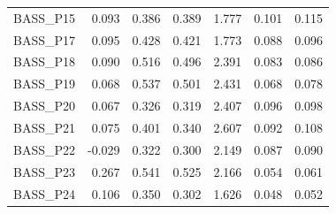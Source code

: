 \begin{table}[p]
\begin{tabular}{lrrrrrr}
BASS\_P15 & 0.093 & 0.386 & 0.389 & 1.777 & 0.101 & 0.115\\
BASS\_P17 & 0.095 & 0.428 & 0.421 & 1.773 & 0.088 & 0.096\\
BASS\_P18 & 0.090 & 0.516 & 0.496 & 2.391 & 0.083 & 0.086\\
BASS\_P19 & 0.068 & 0.537 & 0.501 & 2.431 & 0.068 & 0.078\\
BASS\_P20 & 0.067 & 0.326 & 0.319 & 2.407 & 0.096 & 0.098\\
BASS\_P21 & 0.075 & 0.401 & 0.340 & 2.607 & 0.092 & 0.108\\
BASS\_P22 & -0.029 & 0.322 & 0.300 & 2.149 & 0.087 & 0.090\\
BASS\_P23 & 0.267 & 0.541 & 0.525 & 2.166 & 0.054 & 0.061\\
BASS\_P24 & 0.106 & 0.350 & 0.302 & 1.626 & 0.048 & 0.052\\
\bottomrule\end{tabular}
\end{table}\clearpage
